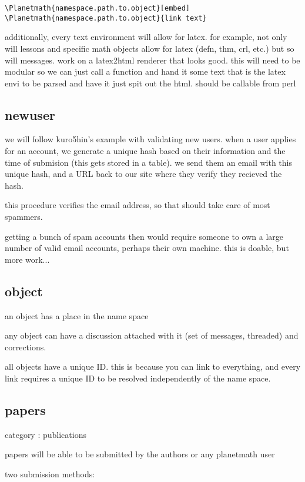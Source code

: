 \verb|\Planetmath{namespace.path.to.object}[embed]|
\verb|\Planetmath{namespace.path.to.object}{link text}|

additionally, every text environment will allow for latex. for example, not only will lessons and specific math objects allow for latex (defn, thm, crl, etc.) but so will messages. work on a latex2html renderer that looks good. this will need to be modular so we can just call a function and hand it some text that is the latex envi to be parsed and have it just spit out the html. should be callable from perl

\subsection{newuser}

we will follow kuro5hin's example with validating new users.  when a user applies for an account, we generate a unique hash based on their information and the time of submision (this gets stored in a table). we send them an email with this unique hash, and a URL back to our site where they verify they recieved the hash.  

this procedure verifies the email address, so that should take care of most spammers.   

getting a bunch of spam accounts then would require someone to own a large number of valid email accounts, perhaps their own machine.  this is doable, but more work...

\subsection{object}

an object has a place in the name space

any object can have a discussion attached with it (set of messages, threaded) and corrections.

all objects have a unique ID. this is because you can link to everything, and every link requires a unique ID to be resolved independently of the name space.

\subsection{papers}

category : publications

papers will be able to be submitted by the authors or any planetmath user

two submission methods:

